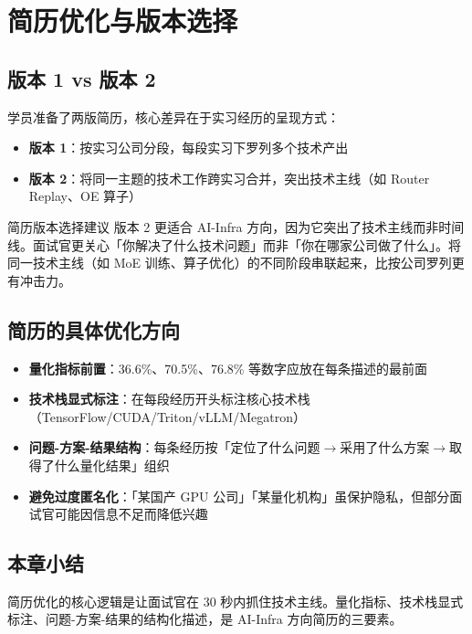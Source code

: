 \documentclass[a4paper]{article}
\begin{document}
\section{简历优化与版本选择}

\subsection{版本 1 vs 版本 2}

学员准备了两版简历，核心差异在于实习经历的呈现方式：

\begin{itemize}
    \item \textbf{版本 1}：按实习公司分段，每段实习下罗列多个技术产出
    \item \textbf{版本 2}：将同一主题的技术工作跨实习合并，突出技术主线（如 Router Replay、OE 算子）
\end{itemize}

\begin{importantbox}{简历版本选择建议}
版本 2 更适合 AI-Infra 方向，因为它突出了技术主线而非时间线。面试官更关心「你解决了什么技术问题」而非「你在哪家公司做了什么」。将同一技术主线（如 MoE 训练、算子优化）的不同阶段串联起来，比按公司罗列更有冲击力。
\end{importantbox}

\subsection{简历的具体优化方向}

\begin{itemize}
    \item \textbf{量化指标前置}：36.6\%、70.5\%、76.8\% 等数字应放在每条描述的最前面
    \item \textbf{技术栈显式标注}：在每段经历开头标注核心技术栈（TensorFlow/CUDA/Triton/vLLM/Megatron）
    \item \textbf{问题-方案-结果结构}：每条经历按「定位了什么问题$\to$采用了什么方案$\to$取得了什么量化结果」组织
    \item \textbf{避免过度匿名化}：「某国产 GPU 公司」「某量化机构」虽保护隐私，但部分面试官可能因信息不足而降低兴趣
\end{itemize}

\subsection{本章小结}
简历优化的核心逻辑是让面试官在 30 秒内抓住技术主线。量化指标、技术栈显式标注、问题-方案-结果的结构化描述，是 AI-Infra 方向简历的三要素。
\end{document}
